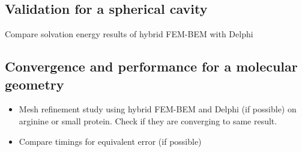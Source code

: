 \subsection*{\sffamily \large Validation for a spherical cavity}

Compare solvation energy results of hybrid FEM-BEM with Delphi

\subsection*{\sffamily \large Convergence and performance for a molecular geometry}
\begin{itemize}
    \item Mesh refinement study using hybrid FEM-BEM and Delphi (if possible) on arginine or small protein. Check if they are converging to same result.
    \item Compare timings for equivalent error (if possible)
\end{itemize}

